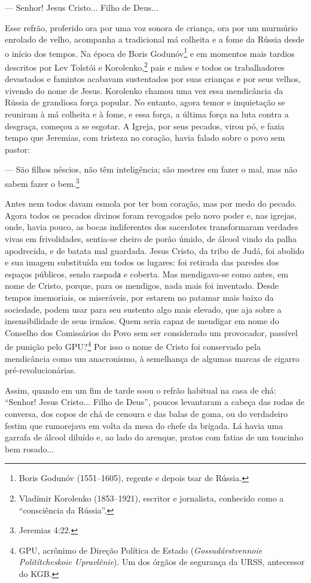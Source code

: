 --- Senhor! Jesus Cristo... Filho de Deus...

Esse refrão, proferido ora por uma voz sonora de criança, ora por um
murmúrio enrolado de velho, acompanha a tradicional má colheita e a fome
da Rússia desde o início dos tempos. Na época de Boris Godunóv\footnote{Boris
  Godunóv (1551--1605), regente e depois tsar de Rússia.} e em momentos
mais tardios descritos por Lev Tolstói e Korolenko,\footnote{Vladímir
  Korolenko (1853--1921), escritor e jornalista, conhecido como a
  ``consciência da Rússia''.} pais e mães e todos os trabalhadores
devastados e famintos acabavam sustentados por suas crianças e por seus
velhos, vivendo do nome de Jesus. Korolenko chamou uma vez essa
mendicância da Rússia de grandiosa força popular. No entanto, agora
temor e inquietação se reuniram à má colheita e à fome, e essa força, a
última força na luta contra a desgraça, começou a se esgotar. A Igreja,
por seus pecados, virou pó, e fazia tempo que Jeremias, com tristeza no
coração, havia falado sobre o povo sem pastor:

--- São filhos néscios, não têm inteligência; são mestres em fazer o
mal, mas não sabem fazer o bem.\footnote{Jeremias 4:22.}

Antes nem todos davam esmola por ter bom coração, mas por medo do
pecado. Agora todos os pecados divinos foram revogados pelo novo poder
e, nas igrejas, onde, havia pouco, as bocas indiferentes dos sacerdotes
transformaram verdades vivas em frivolidades, sentia-se cheiro de porão
úmido, de álcool vindo da palha apodrecida, e de batata mal guardada.
Jesus Cristo, da tribo de Judá, foi abolido e sua imagem substituída em
todos os lugares: foi retirada das paredes dos espaços públicos, sendo
raspadа e coberta. Mas mendigava-se como antes, em nome de Cristo,
porque, para os mendigos, nada mais foi inventado. Desde tempos
imemoriais, os miseráveis, por estarem no patamar mais baixo da
sociedade, podem usar para seu sustento algo mais elevado, que aja sobre
a insensibilidade de seus irmãos. Quem seria capaz de mendigar em nome
do Conselho dos Comissários do Povo sem ser considerado um provocador,
passível de punição pelo GPU?\footnote{GPU, acrônimo de Direção Política
  de Estado (\emph{Gossudárstvennoie Politítcheskoie Upravlênie}). Um
  dos órgãos de segurança da URSS, antecessor do KGB.} Por isso o nome
de Cristo foi conservado pela mendicância como um anacronismo, à
semelhança de algumas marcas de cigarro pré-revolucionárias.

Assim, quando em um fim de tarde soou o refrão habitual na casa de chá:
``Senhor! Jesus Cristo... Filho de Deus'', poucos levantaram a cabeça
das rodas de conversa, dos copos de chá de cenoura e das balas de goma,
ou do verdadeiro festim que rumorejava em volta da mesa do chefe da
brigada. Lá havia uma garrafa de álcool diluído e, ao lado do arenque,
pratos com fatias de um toucinho bem rosado...

